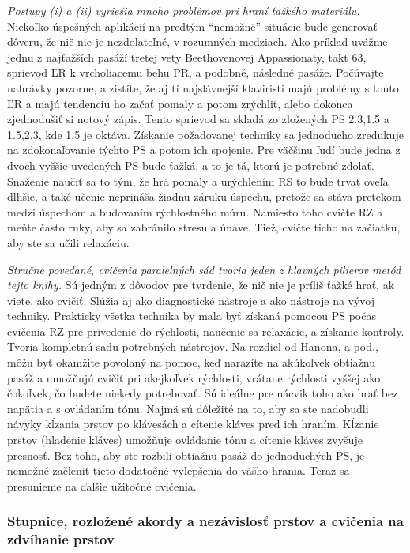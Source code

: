 \emph{Postupy (i) a (ii) vyriešia mnoho problémov pri hraní ťažkého materiálu.} Niekoľko úspešných aplikácií na predtým “nemožné” situácie bude generovať dôveru, že nič nie je nezdolateľné, v rozumných medziach. Ako príklad uvážme jednu z najťažších pasáží tretej vety Beethovenovej Appassionaty, takt 63, sprievod ĽR k vrcholiacemu behu PR, a podobné, následné pasáže. Počúvajte nahrávky pozorne, a zistíte, že aj tí najslávnejší klaviristi majú problémy s touto ĽR a majú tendenciu ho začať pomaly a potom zrýchliť, alebo dokonca zjednodušiť si notový zápis. Tento sprievod sa skladá zo zložených PS 2.3,1.5 a 1.5,2.3, kde 1.5 je oktáva. Získanie požadovanej techniky sa jednoducho zredukuje na zdokonaľovanie týchto PS a potom ich spojenie. Pre väčšinu ľudí bude jedna z dvoch vyššie uvedených PS bude ťažká, a to je tá, ktorú je potrebné zdolať. Snaženie naučiť sa to tým, že hrá pomaly a urýchlením RS to bude trvať oveľa dlhšie, a také učenie neprináša žiadnu záruku úspechu, pretože sa stáva pretekom medzi úspechom a budovaním rýchlostného múru. Namiesto toho cvičte RZ a meňte často ruky, aby sa zabránilo stresu a únave. Tiež, cvičte ticho na začiatku, aby ste sa učili relaxáciu.

\emph{Stručne povedané, cvičenia paralelných sád tvoria jeden z hlavných pilierov metód tejto knihy.} Sú jedným z dôvodov pre tvrdenie, že nič nie je príliš ťažké hrať, ak viete, ako cvičiť. Slúžia aj ako diagnostické nástroje a ako nástroje na vývoj techniky. Prakticky všetka technika by mala byť získaná pomocou PS počas cvičenia RZ pre privedenie do rýchlosti, naučenie sa relaxácie, a získanie kontroly. Tvoria kompletnú sadu potrebných nástrojov. Na rozdiel od Hanona, a pod., môžu byť okamžite povolaný na pomoc, keď narazíte na akúkoľvek obtiažnu pasáž a umožňujú cvičiť pri akejkoľvek rýchlosti, vrátane rýchlosti vyššej ako čokoľvek, čo budete niekedy potrebovať. Sú ideálne pre nácvik toho ako hrať bez napätia a s ovládaním tónu. Najmä sú dôležité na to, aby sa ste nadobudli návyky kĺzania prstov po klávesách a cítenie kláves pred ich hraním. Kĺzanie prstov (hladenie kláves) umožňuje ovládanie tónu a cítenie kláves zvyšuje presnosť. Bez toho, aby ste rozbili obtiažnu pasáž do jednoduchých PS, je nemožné začleniť tieto dodatočné vylepšenia do vášho hrania. Teraz sa presunieme na ďalšie užitočné cvičenia.

\subsubsection{Stupnice, rozložené akordy a nezávislosť prstov a cvičenia na zdvíhanie prstov}

